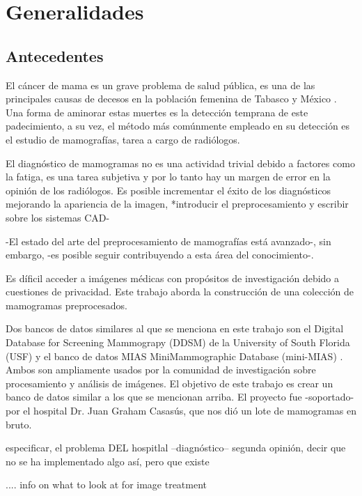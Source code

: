 \chapter{Generalidades}

 \setcounter{page}{1}

\section{Antecedentes}

El cáncer de mama es un grave problema de salud pública, es una de las
principales causas de decesos en la población femenina de Tabasco y México
\cite{inegi, mxcancer}. Una forma de aminorar estas muertes es la detección
temprana de este padecimiento, a su vez, el método más comúnmente empleado en
su detección es el estudio de mamografías, tarea a cargo de radiólogos.

El diagnóstico de mamogramas no es una actividad trivial debido a factores como
la fatiga, es una tarea subjetiva y por lo tanto hay un margen de error en la
opinión de los radiólogos. Es posible incrementar el éxito de los diagnósticos
mejorando la apariencia de la imagen, *introducir el preprocesamiento
y escribir sobre los sistemas CAD-

-El estado del arte del preprocesamiento de mamografías está avanzado-, sin embargo,
-es posible seguir contribuyendo a esta área del conocimiento-. 

Es díficil acceder a imágenes médicas con propósitos de investigación debido a
cuestiones de privacidad. Este trabajo aborda la construcción de una colección
de mamogramas preprocesados.

Dos bancos de datos similares al que se menciona en este trabajo son el Digital
Database for Screening Mammograpy (DDSM) de la University of South Florida
(USF) \cite{heath2000digital} y el banco de datos MIAS MiniMammographic
Database (mini-MIAS) \cite{sucklingmini}. Ambos son ampliamente usados por la
comunidad de investigación sobre procesamiento y análisis de imágenes. El
objetivo de este trabajo es crear un banco de datos similar a los que se
mencionan arriba. El proyecto fue -soportado- por el hospital Dr. Juan Graham
Casasús, que nos dió un lote de mamogramas en bruto.

especificar, el problema DEL
hospitlal --diagnóstico-- segunda opinión, decir que no se ha implementado algo
así, pero que existe
 
.... info on what to look at for image treatment 


